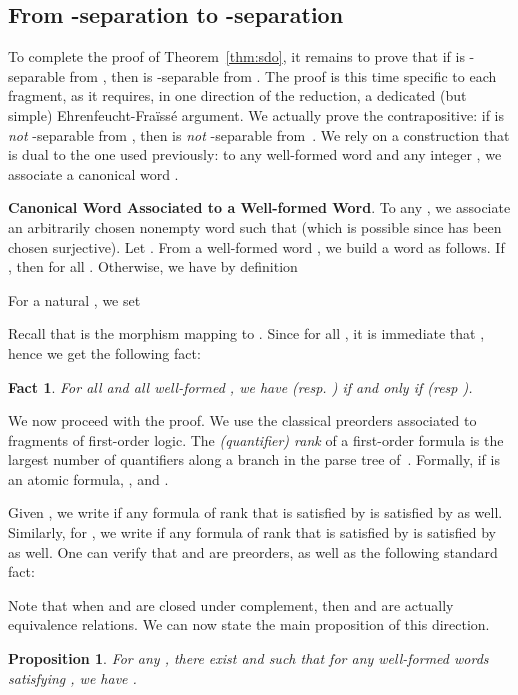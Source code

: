 \documentclass[a4paper,USenglish]{lipics}
\newcommand{\efgame}{Ehrenfeucht-Fra\"iss\'e\xspace}
\newcommand\highlight[1]{\par\bigskip\noindent\textbf{\sffamily #1}.}
\theoremstyle{plain}
\newtheorem{fact}[theorem]{Fact}
\newtheorem{proposition}[theorem]{Proposition}
\begin{document}
\subsection{\texorpdfstring{From -separation to -separation}{From F+-separation to F-separation}}
\label{sec:from-fodp-to-fod}

To complete the proof of Theorem~\ref{thm:sdo}, it remains to prove that if
 is -separable from , then  is -separable from
. The proof is this time specific to each fragment, as it requires, in
one direction of the reduction, a dedicated (but simple) \efgame argument. We
actually prove the contrapositive: if  is \emph{not} -separable
from , then  is \emph{not} -separable from~. We rely on a
construction that is dual to the one used previously: to any well-formed word
 and any integer , we associate a canonical word
.

\highlight{Canonical Word Associated to a Well-formed Word} To any , we associate an arbitrarily chosen nonempty word 
such that  (which is possible since  has been
chosen surjective). Let . From a well-formed word , we
build a word  as follows. If , then
 for all . Otherwise, we have by definition

For a natural , we set

Recall that  is the morphism  mapping  to . Since  for all , it is immediate that , hence we get the following fact:
\begin{fact} \label{fct:cons1}
  For all  and all well-formed , we have  (resp. ) if and only if  (resp
  ).
\end{fact}

We now proceed with the proof. We use the classical preorders associated to
fragments of first-order logic. The \emph{(quantifier) rank}  of a first-order
formula  is the largest number of quantifiers along a branch in the
parse tree of~. Formally,  if  is an atomic
formula, ,
 and .

 Given , we write  if any
 formula of rank  that is satisfied by  is satisfied by  as
well. Similarly, for , we write  if any
 formula of rank  that is satisfied by  is satisfied by 
as well. One can verify that  and  are preorders, as well as
the following standard fact:

Note that when  and  are closed under complement,
then  and  are actually equivalence relations. We can now
state the main proposition of this direction.

\begin{proposition} \label{prop:corr}
  For any , there exist  and  such
  that  for any well-formed words  satisfying
  , we have
  .
\end{proposition}
\end{document}
